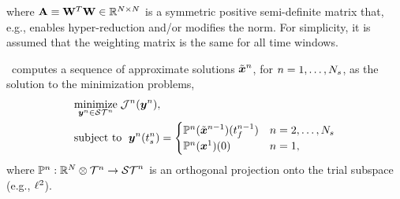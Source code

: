 where $\stweightingMatArg{n} \equiv \stweightingMatOneArg{ }^T \stweightingMatOneArg{ } \in \RR{\fomdim \times \fomdim}$ is a
symmetric positive semi-definite matrix that, e.g., enables hyper-reduction and/or modifies the norm. For simplicity, 
it is assumed that the weighting matrix is the same for all time windows. 

\methodAcronym\ computes a sequence of approximate solutions $\approxstateArgnt{n}$, for $n=1,\ldots,\nslabs$, as the solution to the minimization problems,
\begin{equation}\label{eq:tclsrm}
\begin{split}
      &\underset{\stateyArgnt{n} \in \stspace^n}{\text{minimize}} \; \mathcal{J}^n(\stateyArgnt{n}), \\
      &\text{subject to } \;  \stateyArg{n}{\timeStartArg{n}} =
\begin{cases}\mathbb{P}^n (\approxstateArgnt{n-1})(\timeEndArg{n-1}) & n = 2,\ldots,\nslabs \\
\mathbb{P}^n( \stateFOMArgnt{1})(0)& n=1, \end{cases} 
\end{split}
\end{equation}
where $\mathbb{P}^n: \RR{N} \otimes \timeSpaceArg{n} \rightarrow \stspaceArg{n}$ is an orthogonal projection onto the 
trial subspace (e.g., $\elltwo$).
